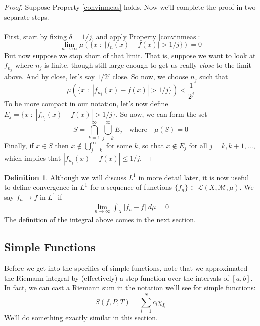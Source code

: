 \documentclass[12pt]{article}
\theoremstyle{plain}
\theoremstyle{definition}
\newtheorem{defn}[thm]{Definition}
\theoremstyle{remark}
\begin{document}
\begin{proof}
Suppose Property \ref{convinmeas} holds. Now we'll complete the proof in two separate steps.
\\
\\
First, start by fixing $\delta = 1/j$, and apply Property \ref{convinmeas}:
\begin{equation}
    \lim_{n\rightarrow\infty} \mu\left(
    \{x \; : \; |f_n(x) - f(x)| > 1/j \}\right)
    = 0
\end{equation}
But now suppose we stop short of that limit. That is, suppose we want to look at $f_{n_j}$ where $n_j$ is finite, though still large enough to get us really \emph{close} to the limit above. And by close, let's say $1/2^j$ close. So now, we choose $n_j$ such that    
\[
    \mu(\{ x \; : \; |f_{n_j}(x) -f(x)|>1/j\}) < \frac{1}{2^j} 
\]
To be more compact in our notation, let's now define $E_j = \{ x \; : \; |f_{n_j}(x) -f(x)|>1/j\}$. So now, we can form the set
\[
    S = \bigcap^\infty_{k=1} \bigcup_{j=k}^\infty E_j 
    \quad \text{where}\quad
    \mu(S)=0
\]
Finally, if $x\in S$ then $x\not\in\bigcup^\infty_{j=k}$ for some $k$, so that $x\not\in E_j$ for all $j=k,k+1,\ldots$, which implies that $|f_{n_j}(x)-f(x)|\leq 1/j$.

\end{proof}

\begin{defn}
Although we will discuss $L^1$ in more detail later, it is now useful to define convergence in $L^1$ for a sequence of functions $\{f_n\}\subset\mathscr{L}(X,\mathscr{M},\mu)$. We say $f_n \rightarrow f$ in $L^1$ if 
\begin{align*}
    \lim_{n\rightarrow\infty} \int_X |f_n-f| \; d\mu
    = 0
\end{align*}
The definition of the integral above comes in the next section.
\end{defn}



\newpage
\subsection{Simple Functions}

Before we get into the specifics of simple functions, note that we approximated the Riemann integral by (effectively) a step function over the intervals of $[a,b]$. In fact, we can cast a Riemann sum in the notation we'll see for simple functions:
    \[ S(f,P,T) = \sum^N_{i=1} c_i \chi_{I_i} \]
We'll do something exactly similar in this section.
\end{document}
